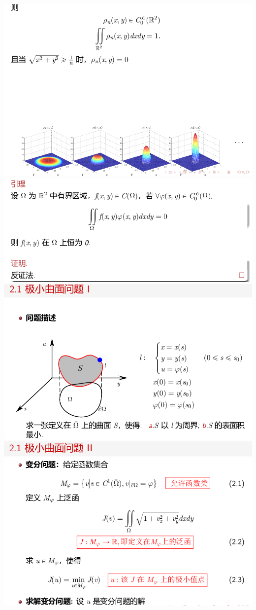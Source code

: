 \documentclass[11pt,a4paper]{ctexart}
\begin{document}
\begin{paracol}{2}
\includegraphics[width=\linewidth]{chap01_48.png}
\includegraphics[width=\linewidth]{chap01_49.png}
\includegraphics[width=\linewidth]{chap01_50.png}
\newpage
\includegraphics[width=\linewidth]{chap01_51.png}

\end{paracol}
\end{document}
